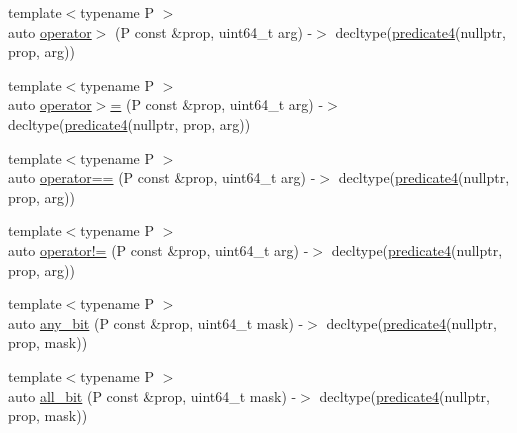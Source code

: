 \begin{DoxyCompactItemize}
\item 
{\footnotesize template$<$typename P $>$ }\\auto \hyperlink{namespacepfq__lang_ab210ad49979608b563eaa74a0d42b63a}{operator$>$} (P const \&prop, uint64\+\_\+t arg) -\/$>$ decltype(\hyperlink{namespacepfq__lang_a1a9064340f4197e3dd4109a849a224dc}{predicate4}(nullptr, prop, arg))
\item 
{\footnotesize template$<$typename P $>$ }\\auto \hyperlink{namespacepfq__lang_ac37c4aac9486ceca12814ccd9b4c3306}{operator$>$=} (P const \&prop, uint64\+\_\+t arg) -\/$>$ decltype(\hyperlink{namespacepfq__lang_a1a9064340f4197e3dd4109a849a224dc}{predicate4}(nullptr, prop, arg))
\item 
{\footnotesize template$<$typename P $>$ }\\auto \hyperlink{namespacepfq__lang_ac55d12423490f127fcb57b29535ca791}{operator==} (P const \&prop, uint64\+\_\+t arg) -\/$>$ decltype(\hyperlink{namespacepfq__lang_a1a9064340f4197e3dd4109a849a224dc}{predicate4}(nullptr, prop, arg))
\item 
{\footnotesize template$<$typename P $>$ }\\auto \hyperlink{namespacepfq__lang_a982f7b6137536d7e75fe9b2c13d581d4}{operator!=} (P const \&prop, uint64\+\_\+t arg) -\/$>$ decltype(\hyperlink{namespacepfq__lang_a1a9064340f4197e3dd4109a849a224dc}{predicate4}(nullptr, prop, arg))
\item 
{\footnotesize template$<$typename P $>$ }\\auto \hyperlink{namespacepfq__lang_a9e93958b1fecbd660154947b474ffd05}{any\+\_\+bit} (P const \&prop, uint64\+\_\+t mask) -\/$>$ decltype(\hyperlink{namespacepfq__lang_a1a9064340f4197e3dd4109a849a224dc}{predicate4}(nullptr, prop, mask))
\item 
{\footnotesize template$<$typename P $>$ }\\auto \hyperlink{namespacepfq__lang_a424b5bd6563ed52fd84807def8ba2f5f}{all\+\_\+bit} (P const \&prop, uint64\+\_\+t mask) -\/$>$ decltype(\hyperlink{namespacepfq__lang_a1a9064340f4197e3dd4109a849a224dc}{predicate4}(nullptr, prop, mask))
\end{DoxyCompactItemize}


